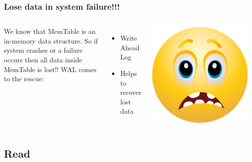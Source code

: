 \documentclass[
	11pt, 
]{beamer}
\begin{document}
\begin{frame}
    \frametitle{Lose data in system failure!!!}

    \begin{columns} 
            We know that MemTable is an in-memory data structure. So if system crashes or a failure occurs then all data inside MemTable is lost!! \newline \newline
            WAL comes to the rescue: 
            \begin{itemize}
                \item Write Ahead Log
                \item Helps to recover lost data
            \end{itemize}
            \includegraphics[scale=0.05]{terrified.png}
    \end{columns}
\end{frame}

\subsection{Read}
\end{document}
